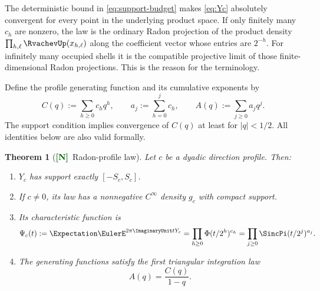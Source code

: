\documentclass[11pt]{article}
\numberwithin{equation}{section}
\newtheorem{theorem}{Theorem}[section]
\theoremstyle{definition}
\theoremstyle{remark}
\newcommand{\New}{\textcolor{darkgreen}{\textsf{\textbf{[N]}}}}
\begin{document}
The deterministic bound in \eqref{eq:support-budget} makes
\eqref{eq:Yc} absolutely convergent for every point in the underlying product
space.  If only finitely many $c_h$ are nonzero, the law is the ordinary Radon
projection of the product density
$\prod_{h,\ell}\RvachevUp(x_{h,\ell})$ along the coefficient vector whose entries are
$2^{-h}$.  For infinitely many occupied shells it is the compatible
projective limit of those finite-dimensional Radon projections.  This is the
reason for the terminology.

Define the profile generating function and its cumulative exponents by
\begin{equation}
 C(q):=\sum_{h\ge0}c_hq^h,
 \qquad
 a_j:=\sum_{h=0}^{j}c_h,
 \qquad
 A(q):=\sum_{j\ge0}a_jq^j.
 \label{eq:C-A-def}
\end{equation}
The support condition implies convergence of $C(q)$ at least for $|q|<1/2$.
All identities below are also valid formally.

\begin{theorem}[\New\ Radon-profile law]
\label{thm:profile-law}
Let $c$ be a dyadic direction profile.  Then:
\begin{enumerate}[label=\textup{(\roman*)},leftmargin=*]
\item $Y_c$ has support exactly $[-S_c,S_c]$.
\item If $c\ne0$, its law has a nonnegative $C^\infty$ density $g_c$ with
      compact support.
\item Its characteristic function is
\begin{equation}
 \Psi_c(t):=\Expectation\EulerE^{2\pi\ImaginaryUnit tY_c}
 =\prod_{h\ge0}\Phi(t/2^h)^{c_h}
 =\prod_{j\ge0}\SincPi(t/2^j)^{a_j}.
 \label{eq:Psi-profile}
\end{equation}
\item The generating functions satisfy the first triangular integration law
\begin{equation}
 A(q)=\frac{C(q)}{1-q}.
 \label{eq:A-C}
\end{equation}
\end{enumerate}
\end{theorem}
\end{document}
